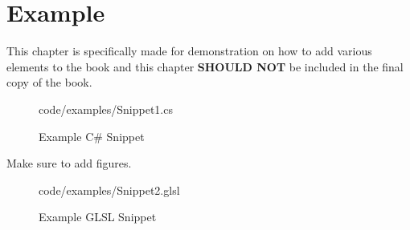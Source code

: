 \chapter{Example}

This chapter is specifically made for demonstration on how to add various elements to the book and this chapter \textbf{SHOULD NOT} be included in the final copy of the book.

\begin{figure}[ht]
    \centering
    \colorbox{backgroundcolor}{
        \parbox{0.9\textwidth}{
            
            {code/examples/Snippet1.cs}
        }
    }
    \caption{Example C\# Snippet}
    \label{fig:example_cs_snippet}
\end{figure}


Make sure to add figures.

\begin{figure}[ht]
    \centering
    \colorbox{backgroundcolor}{
        \parbox{0.9\textwidth}{
            
            {code/examples/Snippet2.glsl}
        }
    }
    \caption{Example GLSL Snippet}
    \label{fig:example_glsl_snippet}
\end{figure}